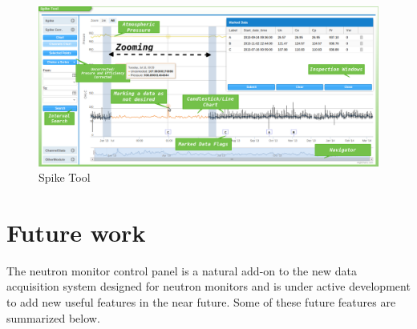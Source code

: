 \documentclass[a4paper]{jpconf}
\begin{document}
\begin{figure}[h]
    \centering
    \includegraphics[keepaspectratio, width=1\textwidth]{./resources/SpikeTool.png}
    \caption{Spike Tool}
    \label{fig:SpikeTool}
\end{figure}

\section{Future work}

The neutron monitor control panel is a natural add-on to the new data
acquisition system designed for neutron monitors and is under active
development to add new useful features in the near future. Some of these future
features are summarized below.
\end{document}
